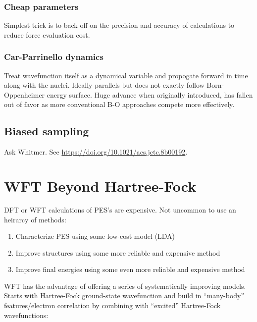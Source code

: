 \documentclass[11pt]{article}
\begin{document}
\subsubsection{Cheap parameters}
\label{sec:org1dd410c}
Simplest trick is to back off on the precision and accuracy of calculations to reduce force evaluation cost.
\subsubsection{Car-Parrinello dynamics}
\label{sec:orga0a7d7a}
Treat wavefunction itself as a dynamical variable and propogate forward in time along with the nuclei. Ideally parallels but does not exactly follow Born-Oppenheimer energy surface.  Huge advance when originally introduced, has fallen out of favor as more conventional B-O approaches compete more effectively.
\subsection{Biased sampling}
\label{sec:org6d0454e}
Ask Whitmer.  See \url{https://doi.org/10.1021/acs.jctc.8b00192}.
\newpage

\section{WFT Beyond Hartree-Fock}
\label{sec:orgb94d7d0}
DFT or WFT calculations of PES's are expensive.  Not uncommon to use an heirarcy of methods:
\begin{enumerate}
\item Characterize PES using some low-cost model (LDA)
\item Improve structures using some more reliable and expensive method
\item Improve final energies using some even more reliable and expensive method
\end{enumerate}

WFT has the advantage of offering a series of systematically improving models. Starts with Hartree-Fock ground-state wavefunction and build in ``many-body'' features/electron correlation by combining with ``excited'' Hartree-Fock wavefunctions:
\end{document}
